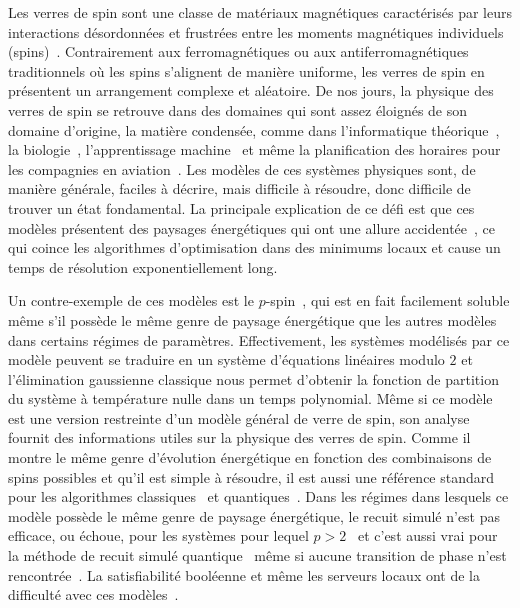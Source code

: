 \begin{comment}
\end{comment}

\Introduction   %

Les verres de spin sont une classe de matériaux magnétiques caractérisés par leurs interactions désordonnées et frustrées entre les moments magnétiques individuels (spins)~\cite{stein2013spin}.
Contrairement aux ferromagnétiques ou aux antiferromagnétiques traditionnels où les spins s'alignent de manière uniforme, les verres de spin en présentent un arrangement complexe et aléatoire.
De nos jours, la physique des verres de spin se retrouve dans des domaines qui sont assez éloignés de son domaine d'origine, la matière condensée, comme dans l'informatique théorique~\cite{kirkpatrick1985configuration}, la biologie~\cite{bryngelson1987spin}, l'apprentissage machine~\cite{venkataraman1991spin} et même la planification des horaires pour les compagnies en aviation~\cite{stein2013spin}.
Les modèles de ces systèmes physiques sont, de manière générale, faciles à décrire, mais difficile à résoudre, donc difficile de trouver un état fondamental.
La principale explication de ce défi est que ces modèles présentent des paysages énergétiques qui ont une allure accidentée~\cite{stein2013spin, qing2009energylandscape}, ce qui coince les algorithmes d'optimisation dans des minimums locaux et cause un temps de résolution exponentiellement long.

Un contre-exemple de ces modèles est le $p$-spin~\cite{mezard_alternative_2002}, qui est en fait facilement soluble même s'il possède le même genre de paysage énergétique que les autres modèles dans certains régimes de paramètres.
Effectivement, les systèmes modélisés par ce modèle peuvent se traduire en un système d'équations linéaires modulo $2$ et l'élimination gaussienne classique nous permet d'obtenir la fonction de partition du système à température nulle dans un temps polynomial.
Même si ce modèle est une version restreinte d'un modèle général de verre de spin, son analyse fournit des informations utiles sur la physique des verres de spin.
Comme il montre le même genre d'évolution énergétique en fonction des combinaisons de spins possibles et qu'il est simple à résoudre, il est aussi une référence standard pour les algorithmes classiques~\cite{bernaschi2021we, kanao2022simulated, aadit2023all} et quantiques~\cite{jorg2010first, farhi2012performance, hen2019equation, bellitti2021entropic, kowalsky20223, patil_obstacles_2019}.
Dans les régimes dans lesquels ce modèle possède le même genre de paysage énergétique, le recuit simulé n'est pas efficace, ou échoue, pour les systèmes pour lequel $p > 2$~\cite{patil_obstacles_2019, bellitti2021entropic} et c'est aussi vrai pour la méthode de recuit simulé quantique~\cite{farhi2012performance} même si aucune transition de phase n'est rencontrée~\cite{patil_obstacles_2019}.
La satisfiabilité booléenne et même les serveurs locaux ont de la difficulté avec ces modèles~\cite{haanpaa2006hard, jarvisalo2006further,jia2004spin, barthel2002hiding, ricci2001simplest, guidetti2011complexity}.

